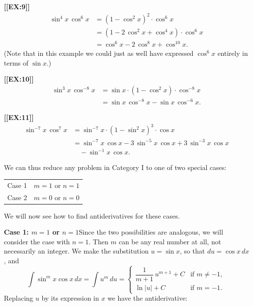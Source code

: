 {\bf [[EX:9]]}\quad
\begin{align*}
\sin^4{x}\,\cos^6{x}
  &= (1-\cos^2{x})^2\cdot\cos^6{x} \\
  &= (1-2\,\cos^2{x}+\cos^4{x})\cdot\cos^6{x} \\
  &= \cos^6{x}-2\,\cos^8{x}+\cos^{10}{x}.
\end{align*}
(Note that in this example we could just as well have expressed
$\cos^6{x}$ entirely in terms of $\sin{x}$.)





{\bf [[EX:10]]}\quad
\begin{align*}
\sin^3{x}\,\cos^{-8}{x}
  &= \sin{x}\cdot (1-\cos^2{x})\cdot\cos^{-8}{x} \\
  &= \sin{x}\,\cos^{-8}{x}-\sin{x}\,\cos^{-6}{x}.
\end{align*}





{\bf [[EX:11]]}\quad
\begin{align*}
\sin^{-7}{x}\,\cos^{7}{x}
  &= \sin^{-7}{x}\cdot (1-\sin^2{x})^3\cdot\cos{x} \\
  &= \sin^{-7}{x}\,\cos{x}-3\,\sin^{-5}{x}\,\cos{x}+3\,\sin^{-3}{x}\,\cos{x} \\
  & \mbox{}\quad -\sin^{-1}{x}\,\cos{x}.
\end{align*}



We can thus reduce any problem in Category I to one of two special cases:
\begin{center}


\begin{tabular}{rl}
Case 1&$m=1$ or $n=1$ \\
Case 2&$m=0$ or $n=0$ \\
\end{tabular}

\end{center}
We will now see how to find antiderivatives for these cases.





{\bf Case 1: \boldmath $m=1$ or $n=1$}\quad Since the two
possibilities are analogous, we will consider the case with
$n=1$. Then $m$ can be any real number at all, not necessarily an
integer.  We make the substitution $u=\sin{x}$, so that
$du=\cos{x}\,dx$, and
\[
\int \sin^m{x}\cos{x}\,dx = \int u^m\,du = 
\begin{cases}
\dfrac{1}{m+1} \,u^{m+1} + C & \mbox{if $m\neq -1$}, \\[10pt]
\ln{|u|} + C & \mbox{if $m=-1$}.
\end{cases}
\]
Replacing $u$ by its expression in $x$ we have the antiderivative:

